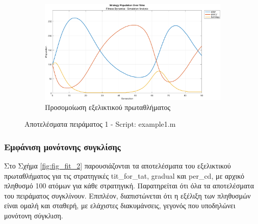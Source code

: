 \documentclass[12pt]{report}
\begin{document}
\begin{figure}[htbp]
    \hfill
    \begin{subfigure}[b]{0.5\linewidth}
        \centering
        \includegraphics[width=\linewidth]{Figures Fitness Dynamics/example1-sim.png}
        \caption{Προσομοίωση εξελικτικού πρωταθλήματος}
        \label{fig:fig_fit_1_c}
    \end{subfigure}

    \caption{Αποτελέσματα πειράματος 1 - \foreignlanguage{english}{Script: example1.m}}
    \label{fig:fig_fit_1}
\end{figure}


\subsubsection{Εμφάνιση μονότονης συγκλίσης}
Στο Σχήμα \ref{fig:fig_fit_2} παρουσιάζονται τα αποτελέσματα του εξελικτικού πρωταθλήματος για τις στρατηγικές \foreignlanguage{english}{tit\_for\_tat}, \foreignlanguage{english}{gradual} και \foreignlanguage{english}{per\_cd}, με αρχικό πληθυσμό 100 ατόμων για κάθε στρατηγική. Παρατηρείται ότι όλα τα αποτελέσματα του πειράματος συγκλίνουν. Επιπλέον, διαπιστώνεται ότι η εξέλιξη των πληθυσμών είναι ομαλή και σταθερή, με ελάχιστες διακυμάνσεις, γεγονός που υποδηλώνει μονότονη σύγκλιση.
\end{document}
